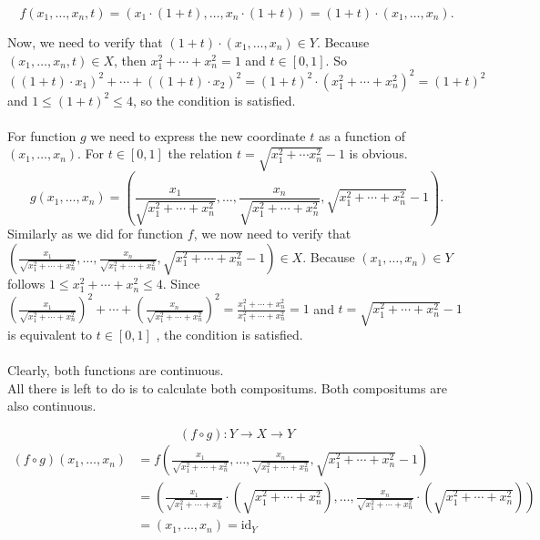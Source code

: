 \documentclass[a4paper,11pt]{article}
\begin{document}
$$ f(x_1, \ldots, x_n, t) =  \left( x_1 \cdot (1 + t), \ldots, x_n \cdot (1 + t) \right) = (1 + t) \cdot (x_1, \ldots, x_n). $$

\noindent
Now, we need to verify that $(1 + t) \cdot (x_1, \ldots, x_n) \in Y$. Because $(x_1, \ldots, x_n, t) \in X$, then $x_1^2 + \cdots + x_n^2 = 1$ and $t \in [0,1]$.
So $((1 + t) \cdot x_1)^2 + \cdots + ((1 + t) \cdot x_2)^2 = (1 + t)^2 \cdot (x_1^2 + \cdots + x_n^2)^2 = (1 + t)^2$ and $1 \leq (1 + t)^2 \leq 4$, so the condition is satisfied.
\\
\\
For function $g$ we need to express the new coordinate $t$ as a function of $(x_1, \ldots, x_n)$. For $t \in [0, 1]$ the relation $t = \sqrt{x_1^2 + \cdots x_n^2} - 1 $ is obvious. 
$$ g(x_1, \ldots, x_n) = \left( \frac{x_1}{ \sqrt{x_1^2 + \cdots + x_n^2}}, \ldots, \frac{x_n}{ \sqrt{x_1^2 + \cdots + x_n^2}}, \sqrt{x_1^2 + \cdots + x_n^2} - 1 \right). $$ 
\noindent
Similarly as we did for function $f$, we now need to verify that \\
$ \left( \frac{x_1}{ \sqrt{x_1^2 + \cdots + x_n^2}}, \ldots, \frac{x_n}{ \sqrt{x_1^2 + \cdots + x_n^2}}, \sqrt{x_1^2 + \cdots + x_n^2} - 1 \right) \in X$.
Because $(x_1, \ldots, x_n) \in Y$ follows  $1 \leq x_1^2 + \cdots + x_n^2 \leq 4$. Since $\left( \frac{x_1}{ \sqrt{x_1^2 + \cdots + x_n^2}} \right)^2 + \cdots + \left( \frac{x_n}{ \sqrt{x_1^2 + \cdots + x_n^2}} \right)^2 = \frac{x_1^2 + \cdots + x_n^2}{x_1^2 + \cdots + x_n^2} = 1$ and $t = \sqrt{x_1^2 + \cdots + x_n^2} - 1$ is equivalent to $ t \in [0, 1]$ , the condition is satisfied.
\\
\\
Clearly, both functions are continuous. \\
All there is left to do is to calculate both compositums. Both compositums are also continuous.

$$ (f \circ g): Y \to X \to Y $$
\begin{align*} 
    (f \circ g)(x_1, \ldots, x_n) &= f \left( \frac{x_1}{ \sqrt{x_1^2 + \cdots + x_n^2}}, \ldots, \frac{x_n}{ \sqrt{x_1^2 + \cdots + x_n^2}}, \sqrt{x_1^2 + \cdots + x_n^2} - 1 \right) \\
    &= \left( \frac{x_1}{ \sqrt{x_1^2 + \cdots + x_n^2}} \cdot \left( \sqrt{x_1^2 + \cdots + x_n^2} \right), \ldots, \frac{x_n}{ \sqrt{x_1^2 + \cdots + x_n^2}} \cdot \left( \sqrt{x_1^2 + \cdots + x_n^2} \right) \right) \\
    &= (x_1, \ldots, x_n) = \text{id}_Y
\end{align*}
\end{document}
